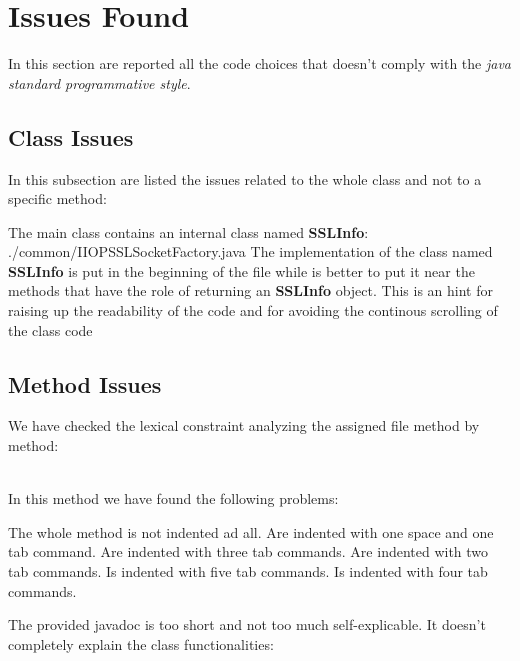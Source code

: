 \section{Issues Found}
\configureJava{}
In this section are reported all the code choices that doesn't comply with the \textit{java standard programmative style}.
\subsection{Class Issues}
In this subsection are listed the issues related to the whole class and not to a specific method:
\begin{itemize}
	 The main class contains an internal class named \textbf{SSLInfo}:
	{./common/IIOPSSLSocketFactory.java}
	 The implementation of the class named \textbf{SSLInfo} is put in the beginning of the file while is better to put it near the methods that have the role of returning an \textbf{SSLInfo} object. This is an hint for raising up the readability of the code and for avoiding the continous scrolling of the class code
 \end{itemize}
\subsection{Method Issues}
We have checked the lexical constraint analyzing the assigned file method by method:
\begin{itemize}
	\\
	In this method we have found the following problems:
	\begin{itemize}
		\begin{itemize}
			 The whole method is not indented ad all.
			 Are indented with one space and one tab command.
			 Are indented with three tab commands.
			 Are indented with two tab commands.
			 Is indented with five tab commands.
			 Is indented with four tab commands.
		\end{itemize}
		 The provided javadoc is too short and not too much self-explicable. It doesn't completely explain the class functionalities:
	\end{itemize}
\end{itemize}